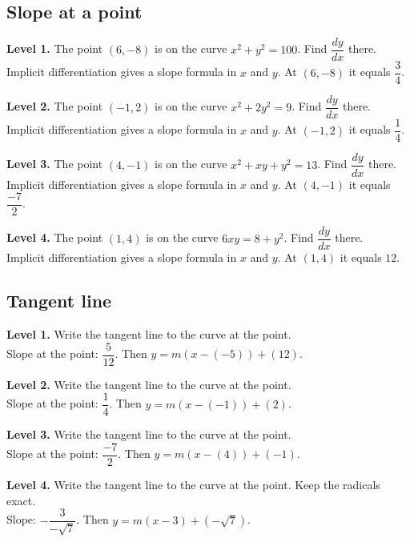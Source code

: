 \documentclass[11pt]{article}
\begin{document}
\subsection*{Slope at a point}
\noindent\textbf{Level 1.} The point $(6,-8)$ is on the curve $x^{2}+y^{2}=100$. Find $\dfrac{dy}{dx}$ there.\\  \quad Implicit differentiation gives a slope formula in $x$ and $y$. At $(6,-8)$ it equals $\dfrac{3}{4}$.\par\medskip
\noindent\textbf{Level 2.} The point $(-1,2)$ is on the curve $x^{2}+2y^{2}=9$. Find $\dfrac{dy}{dx}$ there.\\  \quad Implicit differentiation gives a slope formula in $x$ and $y$. At $(-1,2)$ it equals $\dfrac{1}{4}$.\par\medskip
\noindent\textbf{Level 3.} The point $(4,-1)$ is on the curve $x^{2}+xy+y^{2}=13$. Find $\dfrac{dy}{dx}$ there.\\  \quad Implicit differentiation gives a slope formula in $x$ and $y$. At $(4,-1)$ it equals $\dfrac{-7}{2}$.\par\medskip
\noindent\textbf{Level 4.} The point $(1,4)$ is on the curve $6xy=8+y^{2}$. Find $\dfrac{dy}{dx}$ there.\\  \quad Implicit differentiation gives a slope formula in $x$ and $y$. At $(1,4)$ it equals $12$.\par\medskip
\subsection*{Tangent line}
\noindent\textbf{Level 1.} Write the tangent line to the curve at the point.\\  \quad Slope at the point: $\dfrac{5}{12}$. Then $y=m(x-(-5))+(12)$.\par\medskip
\noindent\textbf{Level 2.} Write the tangent line to the curve at the point.\\  \quad Slope at the point: $\dfrac{1}{4}$. Then $y=m(x-(-1))+(2)$.\par\medskip
\noindent\textbf{Level 3.} Write the tangent line to the curve at the point.\\  \quad Slope at the point: $\dfrac{-7}{2}$. Then $y=m(x-(4))+(-1)$.\par\medskip
\noindent\textbf{Level 4.} Write the tangent line to the curve at the point. Keep the radicals exact.\\  \quad Slope: $-\dfrac{3}{-\sqrt{7}}$. Then $y=m(x-3)+(-\sqrt{7})$.\par\medskip
\end{document}
